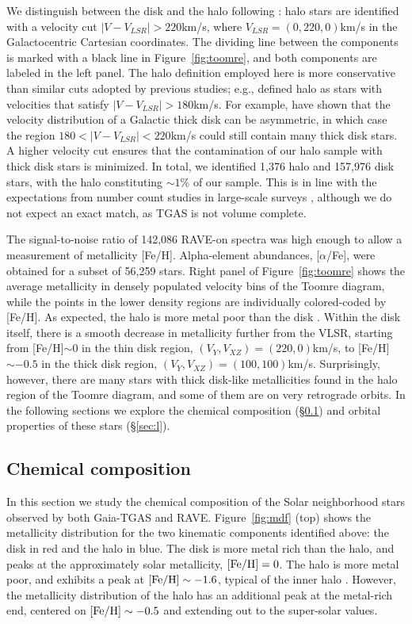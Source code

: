 \documentclass[apj, twocolappendix, numberedappendix, appendixfloats]{emulateapj}
\begin{document}
We distinguish between the disk and the halo following \citet{ns2010}: halo stars are identified with a velocity cut $|V-V_{LSR}|>220$\;km/s, where $V_{LSR} = (0,220,0)$\;km/s in the Galactocentric Cartesian coordinates.
The dividing line between the components is marked with a black line in Figure~\ref{fig:toomre}, and both components are labeled in the left panel.
The halo definition employed here is more conservative than similar cuts adopted by previous studies; e.g., \citet{ns2010} defined halo as stars with velocities that satisfy $|V-V_{LSR}|>180$\;km/s.
For example, \citet{sb2009} have shown that the velocity distribution of a Galactic thick disk can be asymmetric, in which case the region $180<|V-V_{LSR}|<220$\;km/s could still contain many thick disk stars.
A higher velocity cut ensures that the contamination of our halo sample with thick disk stars is minimized.
In total, we identified 1,376 halo and 157,976 disk stars, with the halo constituting $\sim1\%$ of our sample.
This is in line with the expectations from number count studies in large-scale surveys \citep[e.g.,][]{juric2008}, although we do not expect an exact match, as TGAS is not volume complete.

The signal-to-noise ratio of 142,086 RAVE-on spectra was high enough to allow a measurement of metallicity [Fe/H].
Alpha-element abundances, [$\alpha$/Fe], were obtained for a subset of 56,259 stars.
Right panel of Figure~\ref{fig:toomre} shows the average metallicity in densely populated velocity bins of the Toomre diagram, while the points in the lower density regions are individually colored-coded by [Fe/H].
As expected, the halo is more metal poor than the disk \citep[e.g.,][]{ivezic2008}.
Within the disk itself, there is a smooth decrease in metallicity further from the VLSR, starting from [Fe/H]$\sim0$ in the thin disk region, $(V_Y, V_{XZ})=(220,0)$\;km/s, to [Fe/H]$\sim-0.5$ in the thick disk region, $(V_Y, V_{XZ})=(100,100)$\;km/s.
Surprisingly, however, there are many stars with thick disk-like metallicities found in the halo region of the Toomre diagram, and some of them are on very retrograde orbits.
In the following sections we explore the chemical composition (\S\ref{sec:chem}) and orbital properties of these stars (\S\ref{sec:l}).

\subsection{Chemical composition}
\label{sec:chem}
In this section we study the chemical composition of the Solar neighborhood stars observed by both Gaia-TGAS and RAVE.
Figure~\ref{fig:mdf} (top) shows the metallicity distribution for the two kinematic components identified above: the disk in red and the halo in blue.
The disk is more metal rich than the halo, and peaks at the approximately solar metallicity, $\rm[Fe/H]=0$.
The halo is more metal poor, and exhibits a peak at $\rm[Fe/H]\sim-1.6$, typical of the inner halo \citep[e.g.,][]{allende-prieto2006}.
However, the metallicity distribution of the halo has an additional peak at the metal-rich end, centered on $\rm[Fe/H]\sim-0.5$ and extending out to the super-solar values.
\end{document}
